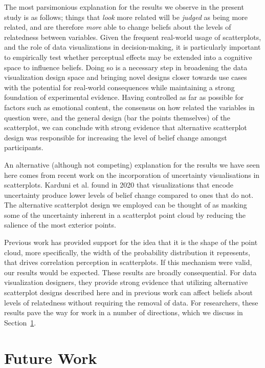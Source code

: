 \documentclass[manuscript,screen,review,anonymous]{acmart}
\begin{document}
The most parsimonious explanation for the results we observe in the
present study is as follows; things that \emph{look} more related will
be \emph{judged} as being more related, and are therefore \emph{more}
able to change beliefs about the levels of relatedness between
variables. Given the frequent real-world usage of scatterplots, and the
role of data visualizations in decision-making, it is particularly
important to empirically test whether perceptual effects may be extended
into a cognitive space to influence beliefs. Doing so is a necessary
step in broadening the data visualization design space and bringing
novel designs closer towards use cases with the potential for real-world
consequences while maintaining a strong foundation of experimental
evidence. Having controlled as far as possible for factors such as
emotional content, the consensus on how related the variables in
question were, and the general design (bar the points themselves) of the
scatterplot, we can conclude with strong evidence that alternative
scatterplot design was responsible for increasing the level of belief
change amongst participants.

An alternative (although not competing) explanation for the results we
have seen here comes from recent work on the incorporation of
uncertainty visualisations in scatterplots. Karduni et al.
\citep{karduni_2020} found in 2020 that visualizations that encode
uncertainty produce lower levels of belief change compared to ones that
do not. The alternative scatterplot design we employed can be thought of
as masking some of the uncertainty inherent in a scatterplot point cloud
by reducing the salience of the most exterior points.

Previous work has provided support for the idea that it is the shape of
the point cloud, more specifically, the width of the probability
distribution it represents, that drives correlation perception in
scatterplots. If this mechanism were valid, our results would be
expected. These results are broadly consequential. For data
visualization designers, they provide strong evidence that utilizing
alternative scatterplot designs described here and in previous work can
affect beliefs about levels of relatedness without requiring the removal
of data. For researchers, these results pave the way for work in a
number of directions, which we discuss in Section~\ref{sec-future-work}.

\section{Future Work}\label{sec-future-work}
\end{document}
